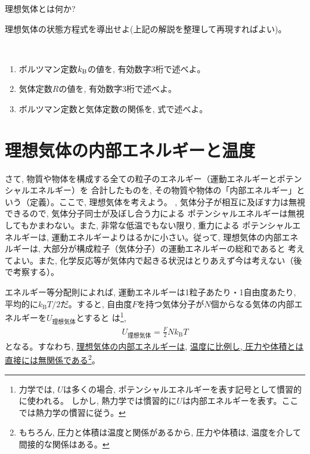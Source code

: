 \begin{q}\label{q:def_ideal_gas}
理想気体とは何か?
\end{q}\mv

\begin{q}\label{q:ideal_gas_eq}
理想気体の状態方程式を導出せよ(上記の解説を整理して再現すればよい)。
\end{q}\mv

\begin{q}\label{q:tempera_kBR}　
\begin{enumerate}
\item ボルツマン定数$k_{\text B}$の値を, 有効数字3桁で述べよ。
\item 気体定数$R$の値を, 有効数字3桁で述べよ。
\item ボルツマン定数と気体定数の関係を, 式で述べよ。
\end{enumerate}\end{q}
\hv



\section{理想気体の内部エネルギーと温度}

さて, 物質や物体を構成する全ての粒子のエネルギー（運動エネルギーとポテンシャルエネルギー）を
合計したものを, その物質や物体の「内部エネルギー」という（定義）。ここで, 理想気体を考えよう。 
, 気体分子が相互に及ぼす力は無視できるので, 気体分子同士が及ぼし合う力による
ポテンシャルエネルギーは無視してもかまわない。また, 非常な低温でもない限り, 重力による
ポテンシャルエネルギーは, 運動エネルギーよりはるかに小さい。従って, 
理想気体の内部エネルギーは, 大部分が構成粒子（気体分子）の運動エネルギーの総和であると
考えてよい。また, 化学反応等が気体内で起きる状況はとりあえず今は考えない（後で考察する）。

エネルギー等分配則によれば, 運動エネルギーは1粒子あたり・1自由度あたり, 
平均的に$k_{\text{B}}T/2$だ。すると, 自由度$F$を持つ気体分子が$N$個からなる気体の内部エネルギーを$U_{\text{理想気体}}$とすると
は\footnote{力学では, $U$は多くの場合, ポテンシャルエネルギーを表す記号として慣習的に使われる。
しかし, 熱力学では慣習的に$U$は内部エネルギーを表す。ここでは熱力学の慣習に従う。}, 
\begin{eqnarray}U_{\text{理想気体}}=\frac{F}{2}Nk_{\text{B}}T\label{eq:gas_int_energy0}\end{eqnarray}
となる。すなわち, \underline{理想気体の内部エネルギーは}, \underline{温度に比例し, 
圧力や体積とは直接には無関係である}\footnote{もちろん, 圧力と体積は温度と関係があるから, 
圧力や体積は, 温度を介して間接的な関係はある。}。

